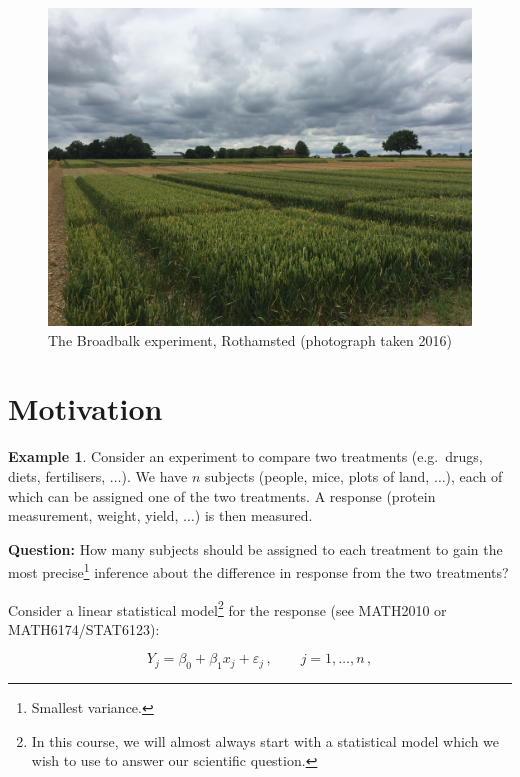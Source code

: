 \documentclass[
]{book}
\theoremstyle{definition}
\theoremstyle{definition}
\newtheorem{example}{Example}[chapter]
\theoremstyle{definition}
\theoremstyle{definition}
\theoremstyle{remark}
\begin{document}
\begin{figure}
 
 {\centering \includegraphics[width=0.75\linewidth]{figures/broadbalk} 
 
 }
 
 \caption{The Broadbalk experiment, Rothamsted (photograph taken 2016)}\label{fig:broadbalk}
 \end{figure}

\hypertarget{motivation}{%
\section{Motivation}\label{motivation}}

\begin{example}
\protect\hypertarget{exm:motivation}{}\label{exm:motivation}Consider an experiment to compare two treatments (e.g.~drugs, diets, fertilisers, \(\dots\)). We have \(n\) subjects (people, mice, plots of land, \(\dots\)), each of which can be assigned one of the two treatments. A response (protein measurement, weight, yield, \(\dots\)) is then measured.
\end{example}

\textbf{Question:} How many subjects should be assigned to each treatment to gain the most precise\footnote{Smallest variance.} inference about the difference in response from the two treatments?

Consider a linear statistical model\footnote{In this course, we will almost always start with a statistical model which we wish to use to answer our scientific question.} for the response (see MATH2010 or MATH6174/STAT6123):

\begin{equation}
Y_j=\beta_{0}+\beta_{1}x_j+\varepsilon_j\,,\qquad j=1, \ldots, n\,,
\label{eq:slr}
\end{equation}
\end{document}
